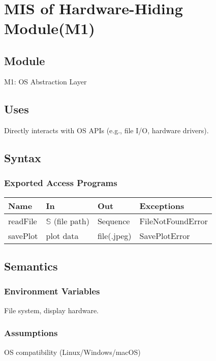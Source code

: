 \documentclass[12pt, titlepage]{article}
\begin{document}
\newpage
~\newpage

\section{MIS of Hardware-Hiding Module(M1)}

\subsection{Module}
M1: OS Abstraction Layer

\subsection{Uses}

\item Directly interacts with OS APIs (e.g., file I/O, hardware drivers).


\subsection{Syntax}

\subsubsection{Exported Access Programs}

\begin{center}
\begin{tabular}{p{2cm} p{4cm} p{4cm} p{4cm}}
\hline
\textbf{Name} & \textbf{In} & \textbf{Out} & \textbf{Exceptions} \\
\hline
readFile & $\mathbb{S}$ (file path) & Sequence & FileNotFoundError \\
savePlot & plot data & file(.jpeg) & SavePlotError \\
\hline
\end{tabular}
\end{center}

\subsection{Semantics}

\subsubsection{Environment Variables}

File system, display hardware.
\subsubsection{Assumptions}
OS compatibility (Linux/Windows/macOS)
\end{document}
